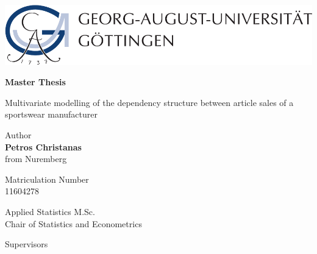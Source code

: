 
\thispagestyle{empty}
\begin{center}


\begin{minipage}{0.75\linewidth}
    \centering
    \includegraphics[scale = 0.7]{figures/uni_goettingen_logo.pdf}\\
    
    \vspace{1cm}
    
{{\Huge \textbf{Master Thesis} \par}}
    
\vspace{0.5cm}
    
    {{\LARGE Multivariate modelling of the dependency structure between article sales of a sportswear manufacturer\par}}
    \vspace{1cm}
    
    
\begin{center}
Author\\
{\LARGE \textbf{Petros Christanas}} \\
from Nuremberg


\vspace{0.5cm}

Matriculation Number \\
{\large 11604278}

\vspace{1cm}

{\Large Applied Statistics M.Sc.}\\
{\large Chair of Statistics and Econometrics}

\end{center}
    
    \end{minipage}
\end{center}


\vspace{1.5cm}

\noindent Supervisors\\
 \\
 \\

\vspace{0.5cm}
    
\begin{flushleft}
 \\
\end{flushleft}

    
    

\clearpage